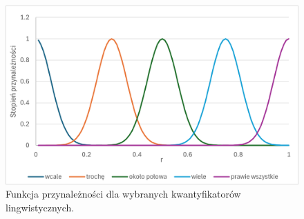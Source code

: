 \documentclass{article}
\begin{document}
\begin{figure}[H]
\centering
\includegraphics[width=\textwidth]{img/a.png}
\caption{Funkcja przynależności dla wybranych kwantyfikatorów lingwistycznych.}
\end{figure}
\end{document}
